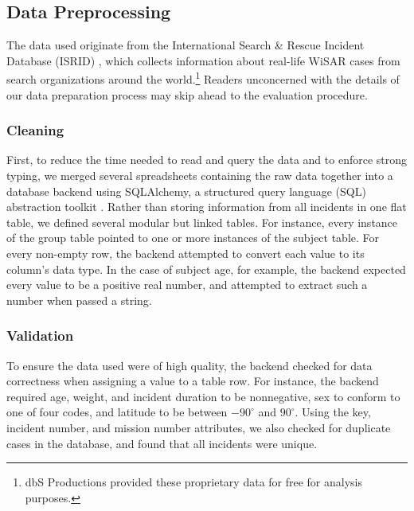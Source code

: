 \documentclass[12pt,titlepage]{article}
\begin{document}
    \subsection{Data Preprocessing}
      The data used originate from the International Search \& Rescue Incident
      Database (ISRID) \cite{isrid}, which collects information about real-life
      WiSAR cases from search organizations around the world.\footnote{dbS
      Productions provided these proprietary data for free for analysis
      purposes.} Readers unconcerned with the details of our data preparation
      process may skip ahead to the evaluation procedure.


      \subsubsection{Cleaning}
        First, to reduce the time needed to read and query the data and to
        enforce strong typing, we merged several spreadsheets containing the
        raw data together into a database backend using SQLAlchemy, a
        structured query language (SQL) abstraction toolkit \cite{sqlalchemy}.
        Rather than storing information from all incidents in one flat table,
        we defined several modular but linked tables. For instance, every
        instance of the group table pointed to one or more instances of the
        subject table. For every non-empty row, the backend attempted to
        convert each value to its column's data type. In the case of subject
        age, for example, the backend expected every value to be a positive
        real number, and attempted to extract such a number when passed a
        string.

      \subsubsection{Validation}
        To ensure the data used were of high quality, the backend checked for
        data correctness when assigning a value to a table row. For instance,
        the backend required age, weight, and incident duration to be
        nonnegative, sex to conform to one of four codes, and latitude to be
        between $-90^\circ$ and $90^\circ$. Using the key, incident number, and
        mission number attributes, we also checked for duplicate cases in the
        database, and found that all incidents were unique.
\end{document}
